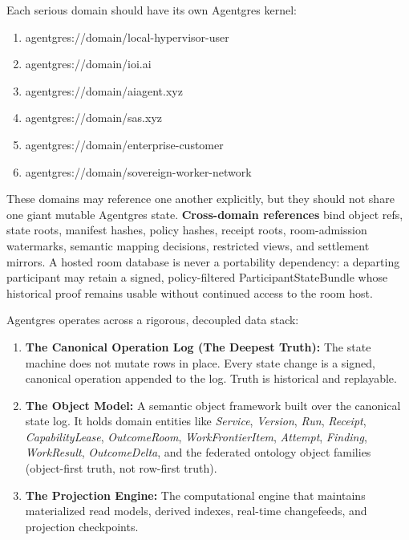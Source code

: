 \documentclass[
  11pt,
]{article}
\providecommand{\tightlist}{%
  \setlength{\itemsep}{0pt}\setlength{\parskip}{0pt}}
\begin{document}
Each serious domain should have its own Agentgres kernel:

\begin{enumerate}
\def\labelenumi{\arabic{enumi}.}
\tightlist
\item
  agentgres://domain/local-hypervisor-user
\item
  agentgres://domain/ioi.ai
\item
  agentgres://domain/aiagent.xyz
\item
  agentgres://domain/sas.xyz
\item
  agentgres://domain/enterprise-customer
\item
  agentgres://domain/sovereign-worker-network
\end{enumerate}

These domains may reference one another explicitly, but they should not
share one giant mutable Agentgres state. \textbf{Cross-domain
references} bind object refs, state roots, manifest hashes, policy
hashes, receipt roots, room-admission watermarks, semantic mapping decisions,
restricted views, and settlement mirrors. A hosted room database is never a
portability dependency: a departing participant may retain a signed,
policy-filtered ParticipantStateBundle whose historical proof remains usable
without continued access to the room host.

Agentgres operates across a rigorous, decoupled data stack:

\begin{enumerate}
\def\labelenumi{\arabic{enumi}.}
\tightlist
\item
  \textbf{The Canonical Operation Log (The Deepest Truth):} The state
  machine does not mutate rows in place. Every state change is a signed,
  canonical operation appended to the log. Truth is historical and
  replayable.
\item
  \textbf{The Object Model:} A semantic object framework built over the
  canonical state log. It holds domain entities like \emph{Service},
  \emph{Version}, \emph{Run}, \emph{Receipt}, \emph{CapabilityLease},
  \emph{OutcomeRoom}, \emph{WorkFrontierItem}, \emph{Attempt},
  \emph{Finding}, \emph{WorkResult}, \emph{OutcomeDelta}, and the federated
  ontology object families (object-first truth, not row-first truth).
\item
  \textbf{The Projection Engine:} The computational engine that
  maintains materialized read models, derived indexes, real-time
  changefeeds, and projection checkpoints.
\end{enumerate}
\end{document}
